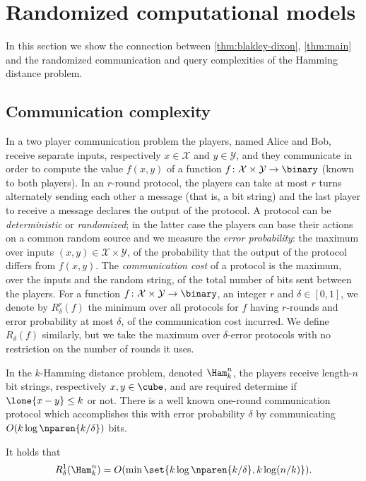 \section{Randomized computational models}
\label{sec:applications}
In this section we show the connection between
\autoref{thm:blakley-dixon}, \autoref{thm:main} and 
the randomized communication and query complexities 
of the Hamming distance problem.

\subsection{Communication complexity}
In a two player communication problem the players, 
named Alice and Bob, receive separate inputs, 
respectively $x\in \mathcal{X}$ and $y\in \mathcal{Y}$, 
and they communicate in order to compute the value 
$f(x,y)$ of a function
$f\colon \mathcal{X}\times \mathcal{Y}\to\binary$ 
(known to both players). 
In an $r$-round protocol, the players can take at most 
$r$ turns alternately sending each other a message 
(that is, a bit string) and the last player to receive 
a message declares the output of the protocol.
A protocol can be {\em deterministic} or {\em randomized}; 
in the latter case the players can base their actions on 
a common random source and we measure the 
{\em error probability}: the maximum over inputs 
$(x,y)\in \mathcal{X}\times\mathcal{Y}$, of the probability 
that the output of the protocol differs from $f(x,y)$. 
The {\em communication cost} of a protocol is the maximum, 
over the inputs and the random string, of the total number 
of bits sent between the players.
For a function 
$f\colon \mathcal{X}\times\mathcal{Y}\to\binary$, 
an integer $r$ and $\delta\in[0,1]$, we denote by 
$R^r_{\delta}(f)$ the minimum over all protocols
for $f$ having $r$-rounds and error probability at most 
$\delta$, of the communication cost incurred. We define 
$R_{\delta}(f)$ similarly, but we take the maximum over 
$\delta$-error protocols with no restriction on the number 
of rounds it uses.

In the $k$-Hamming distance problem, denoted $\Ham^n_k$,
the players receive length-$n$ bit strings, respectively 
$x,y\in\cube$, and are required determine if 
$\lone{x-y}\le k$ or not.
There is a well known one-round communication protocol
which accomplishes this with error probability $\delta$ 
by communicating $O(k\log\nparen{k/\delta})$ bits.

\begin{theorem}
\label{thm:ub}
It holds that $$R^1_\delta(\Ham^n_k) = 
O(\min\set{k\log\nparen{k/\delta}, k\log (n/k)}).$$
\end{theorem}

